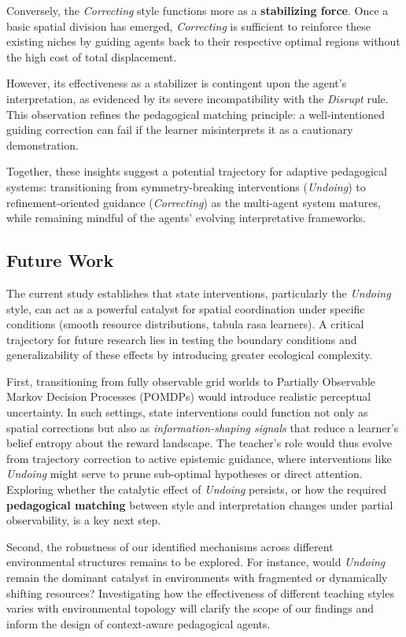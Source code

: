 \documentclass[10pt,letterpaper]{article}
\begin{document}
Conversely, the \emph{Correcting} style functions more as a \textbf{stabilizing force}. Once a basic spatial division has emerged, \emph{Correcting} is sufficient to reinforce these existing niches by guiding agents back to their respective optimal regions without the high cost of total displacement.

However, its effectiveness as a stabilizer is contingent upon the agent's interpretation, as evidenced by its severe incompatibility with the \emph{Disrupt} rule. This observation refines the pedagogical matching principle: a well-intentioned guiding correction can fail if the learner misinterprets it as a cautionary demonstration.

Together, these insights suggest a potential trajectory for adaptive pedagogical systems: transitioning from symmetry-breaking interventions (\emph{Undoing}) to refinement-oriented guidance (\emph{Correcting}) as the multi-agent system matures, while remaining mindful of the agents' evolving interpretative frameworks.


\subsection{Future Work}
The current study establishes that state interventions, particularly the \emph{Undoing} style, can act as a powerful catalyst for spatial coordination under specific conditions (smooth resource distributions, tabula rasa learners). A critical trajectory for future research lies in testing the boundary conditions and generalizability of these effects by introducing greater ecological complexity.

First, transitioning from fully observable grid worlds to Partially Observable Markov Decision Processes (POMDPs) would introduce realistic perceptual uncertainty. In such settings, state interventions could function not only as spatial corrections but also as \emph{information-shaping signals} that reduce a learner's belief entropy about the reward landscape. The teacher's role would thus evolve from trajectory correction to active epistemic guidance, where interventions like \emph{Undoing} might serve to prune sub-optimal hypotheses or direct attention. Exploring whether the catalytic effect of \emph{Undoing} persists, or how the required \textbf{pedagogical matching} between style and interpretation changes under partial observability, is a key next step.

Second, the robustness of our identified mechanisms across different environmental structures remains to be explored. For instance, would \emph{Undoing} remain the dominant catalyst in environments with fragmented or dynamically shifting resources? Investigating how the effectiveness of different teaching styles varies with environmental topology will clarify the scope of our findings and inform the design of context-aware pedagogical agents.
\end{document}
